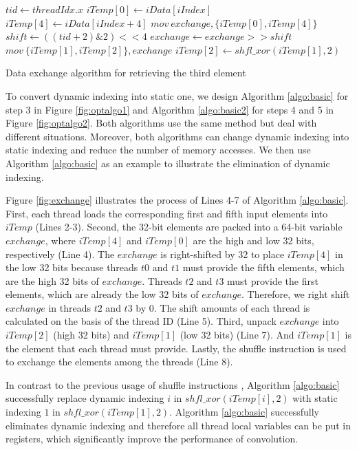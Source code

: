 \begin{algorithm}[t!]
	$tid \gets threadIdx.x$\;
	$iTemp[0] \gets iData[iIndex]$\;
	$iTemp[4] \gets iData[iIndex+4]$\;
	$mov\ exchange, \{iTemp[0], iTemp[4]\}$\;
	$shift \gets ((tid+2)\&2)<<4$\;
	$exchange \gets exchange >> shift$\;
	$mov\ \{iTemp[1],iTemp[2]\}, exchange$\;
	$iTemp[2] \gets shfl\_xor(iTemp[1],2)$\;	
	
	\caption{Data exchange algorithm for retrieving the third element}
	\label{algo:basic}
\end{algorithm}

To convert dynamic indexing into static one, we design Algorithm \ref{algo:basic} for step 3 in Figure \ref{fig:optalgo1} and
Algorithm \ref{algo:basic2} for steps 4 and 5 in Figure \ref{fig:optalgo2}. Both algorithms use the same method but deal with different
situations. Moreover, both algorithms can change dynamic indexing into static indexing and reduce the number of memory accesses. We then use Algorithm
\ref{algo:basic} as an example to illustrate the elimination of dynamic indexing.

Figure \ref{fig:exchange} illustrates the process of Lines 4-7 of Algorithm \ref{algo:basic}. First, each thread loads the corresponding first and fifth input elements into $iTemp$ (Lines 2-3). Second, the 32-bit elements are packed into a 64-bit variable $exchange$, where $iTemp[4]$ and $iTemp[0]$ are the high and low 32 bits, respectively (Line 4). The $exchange$ is right-shifted by 32 to place $iTemp[4]$ in the low 32 bits because threads $t0$ and $t1$ must provide the fifth
elements, which are the high 32 bits of $exchange$. Threads $t2$ and $t3$ must provide the first elements, which are already the low 32 bits of $exchange$. Therefore, we right shift $exchange$ in threads $t2$ and $t3$ by 0. The shift amounts of each thread is calculated on the basis of the thread ID (Line 5). Third, unpack $exchange$ into $iTemp[2]$
(high 32 bits) and $iTemp[1]$ (low 32 bits) (Line 7). And $iTemp[1]$ is the element that each thread must provide. Lastly, the
shuffle instruction is used to exchange the elements among the threads (Line 8).

In contrast to the previous usage of shuffle instructions \cite{vasilache2014fast}, Algorithm \ref{algo:basic} successfully replace dynamic
indexing $i$ in $shfl\_xor(iTemp[i],2)$ with static indexing $1$ in $shfl\_xor(iTemp[1],2)$. Algorithm \ref{algo:basic} successfully
eliminates dynamic indexing and therefore all thread local variables can be put in registers, which significantly improve the performance
of convolution.


